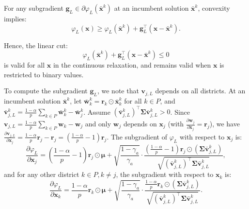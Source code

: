 \documentclass[preprint,12pt,authoryear]{elsarticle}
\begin{document}
For any subgradient $\mathbf{g}_L \in \partial \varphi_L(\bar{\mathbf{x}}^k)$ at an incumbent solution $\bar{\mathbf{x}}^k$, convexity implies:
\begin{equation}
\varphi_L(\mathbf{x}) \geqslant \varphi_L(\bar{\mathbf{x}}^k) + \mathbf{g}_L^\top (\mathbf{x} - \bar{\mathbf{x}}^k).
\end{equation}

Hence, the linear cut:
\begin{equation}
\varphi_L(\bar{\mathbf{x}}^k) + \mathbf{g}_L^\top (\mathbf{x} - \bar{\mathbf{x}}^k) \leqslant 0
\label{eq:rel_workload_supporting_cut_lower}
\end{equation}
is valid for all $\mathbf{x}$ in the continuous relaxation, and remains valid when $\mathbf{x}$ is restricted to binary values.

To compute the subgradient $\mathbf{g}_L$, we note that $\mathbf{v}_{j,L}$ depends on all districts. At an incumbent solution $\bar{\mathbf{x}}^k$, let $\bar{\mathbf{w}}_k^k = \mathbf{r}_k \odot \bar{\mathbf{x}}_k^k$ for all $k \in P$, and $\bar{\mathbf{v}}_{j,L}^k = \frac{1-\alpha}{p} \sum_{k \in P} \bar{\mathbf{w}}_k^k - \bar{\mathbf{w}}_j^k$. Assume $(\bar{\mathbf{v}}_{j,L}^k)^{\top} \boldsymbol{\Sigma} \bar{\mathbf{v}}_{j,L}^k > 0$. Since $\mathbf{v}_{j,L} = \frac{1-\alpha}{p} \sum_{k \in P} \mathbf{w}_k - \mathbf{w}_j$ and only $\mathbf{w}_j$ depends on $\mathbf{x}_j$ (with $\frac{\partial \mathbf{w}_j}{\partial \mathbf{x}_j} = \mathbf{r}_j$), we have $\frac{\partial \mathbf{v}_{j,L}}{\partial \mathbf{x}_j} = \frac{1-\alpha}{p} \mathbf{r}_j - \mathbf{r}_j = \left(\frac{1-\alpha}{p} - 1\right) \mathbf{r}_j$. The subgradient of $\varphi_L$ with respect to $\mathbf{x}_j$ is:
\begin{equation}
\frac{\partial \varphi_L}{\partial \mathbf{x}_j} = \left(\frac{1-\alpha}{p} - 1\right) \mathbf{r}_j \odot \boldsymbol{\mu} + \sqrt{\frac{1-\gamma_a}{\gamma_a}} \cdot \frac{\left(\frac{1-\alpha}{p} - 1\right) \mathbf{r}_j \odot (\boldsymbol{\Sigma} \bar{\mathbf{v}}_{j,L}^k)}{\sqrt{(\bar{\mathbf{v}}_{j,L}^k)^{\top} \boldsymbol{\Sigma} \bar{\mathbf{v}}_{j,L}^k}},
\label{eq:rel_workload_subgradient_L_j}
\end{equation}
and for any other district $k \in P, k \neq j$, the subgradient with respect to $\mathbf{x}_k$ is:
\begin{equation}
\frac{\partial \varphi_L}{\partial \mathbf{x}_k} = \frac{1-\alpha}{p} \mathbf{r}_k \odot \boldsymbol{\mu} + \sqrt{\frac{1-\gamma_a}{\gamma_a}} \cdot \frac{\frac{1-\alpha}{p} \mathbf{r}_k \odot (\boldsymbol{\Sigma} \bar{\mathbf{v}}_{j,L}^k)}{\sqrt{(\bar{\mathbf{v}}_{j,L}^k)^{\top} \boldsymbol{\Sigma} \bar{\mathbf{v}}_{j,L}^k}}.
\label{eq:rel_workload_subgradient_L_k}
\end{equation}
\end{document}
